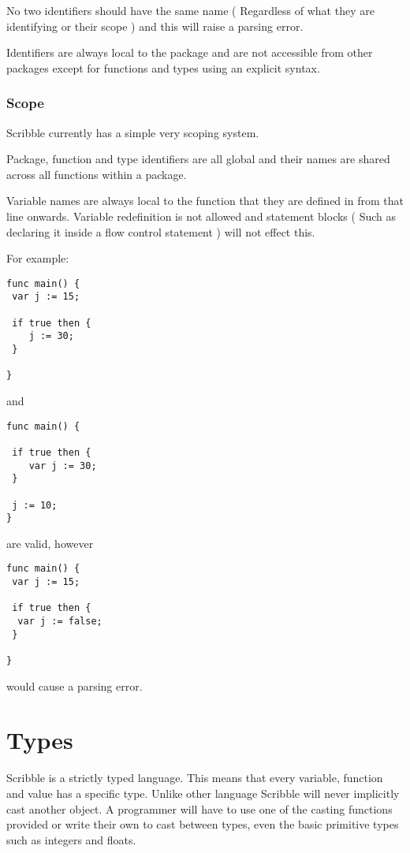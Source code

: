 \documentclass[]{final_report}
\begin{document}
No two identifiers should have the same name ( Regardless of what they are identifying or their scope ) and this will raise a parsing error.

Identifiers are always local to the package and are not accessible from other packages except for functions and types using an explicit syntax.

\subsection{Scope}

Scribble currently has a simple very scoping system.

Package, function and type identifiers are all global and their names are shared across all functions within a package.

Variable names are always local to the function that they are defined in from that line onwards. Variable redefinition is not allowed and statement blocks ( Such as declaring it inside a flow control statement ) will not effect this.

For example:
\begin{verbatim}
func main() {
 var j := 15;
 
 if true then {
 	j := 30;
 }

}
\end{verbatim}
and
\begin{verbatim}
func main() {
 
 if true then {
 	var j := 30;
 }
 
 j := 10;
}
\end{verbatim}
are valid, however
\begin{verbatim}
func main() {
 var j := 15;
 
 if true then { 
  var j := false; 
 }

}
\end{verbatim}
would cause a parsing error.

\chapter{Types}

Scribble is a strictly typed language. This means that every variable, function and value has a specific type. Unlike other language Scribble will never implicitly cast another object. A programmer will have to use one of the casting functions provided or write their own to cast between types, even the basic primitive types such as integers and floats.
\end{document}
